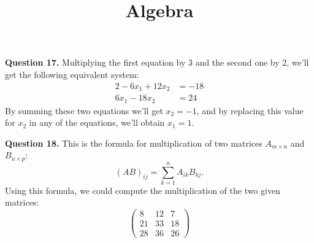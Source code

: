\documentclass{ximera}
\title{Algebra}
\begin{document}
\maketitle

\textbf{Question 17.} Multiplying the first equation by 3 and the second one by 2, we'll get the following equivalent system:
\begin{alignat*}{2}
 -6  x_1  + 12  x_2 & = -18 \\
 6  x_1  - 18  x_2 & = 24
\end{alignat*}
By summing these two equations we'll get $x_2 = -1$, and by replacing this value for $x_2$ in any of the equations, we'll obtain $x_1 = 1$.

\textbf{Question 18.} This is the formula for multiplication of two matrices $A_{m \times n}$ and $B_{n \times p}$:
\begin{equation*}
    (AB)_{ij} = \sum_{k=1}^n A_{ik}B_{kj}. 
\end{equation*}
Using this formula, we could compute the multiplication of the two given matrices:
\begin{equation*}
\begin{pmatrix}
8 & 12 & 7 \\
21 & 33 & 18 \\
28 & 36 & 26
\end{pmatrix}
\end{equation*}
\end{document}
